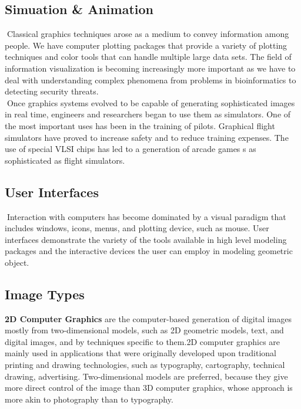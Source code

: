 \documentclass[fontsize=12pt]{article}
\begin{document}
\subsection{Simuation \& Animation}

Classical graphics techniques arose as a medium to convey information among people.	We have computer plotting packages that provide a variety of plotting techniques and color tools that can handle multiple large data sets. The field of information visualization is becoming increasingly more important as we have to deal with understanding complex phenomena from problems in bioinformatics to detecting security threats.\\

Once graphics systems evolved to be capable of generating sophisticated images in real time, engineers and researchers began to use them as simulators. One of the most important uses has been in the training of pilots. Graphical flight simulators have proved to increase safety and to reduce training expenses. The use of special VLSI chips has led to a generation of arcade games s as sophisticated as flight simulators.\\

\subsection{User Interfaces}

Interaction with computers has become dominated by a visual paradigm that includes windows, icons, menus, and    plotting device, such as mouse. User interfaces demonstrate the variety of the tools available in high level modeling packages and the interactive devices the user can employ in modeling geometric object.

\subsection{Image Types}
    \textbf{2D Computer Graphics} are the computer-based generation of digital images mostly from two-dimensional models, such as 2D geometric models, text, and digital images, and by techniques specific to them.2D computer graphics are mainly used in applications that were originally developed upon traditional printing and drawing technologies, such as typography, cartography, technical drawing, advertising. Two-dimensional models are preferred, because they give more direct control of the image than 3D computer graphics, whose approach is more akin to photography than to typography.\\
\end{document}
